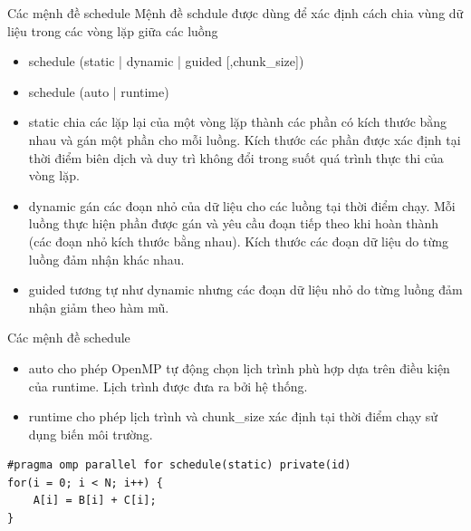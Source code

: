 \documentclass[10pt]{beamer}
\theoremstyle{remark}
\numberwithin{algocf}{section}
\numberwithin{equation}{section}
\numberwithin{dl}{section}
\numberwithin{figure}{section}
\begin{document}
\begin{frame}[fragile]{Các mệnh đề schedule}
    Mệnh đề schdule được dùng để xác định cách chia vùng dữ liệu trong các vòng lặp giữa các luồng
    \begin{itemize}
        \item schedule (static | dynamic | guided [,chunk\_size])
        \item schedule (auto | runtime)
    \end{itemize}
    \begin{itemize}
        \item static chia các lặp lại của một vòng lặp thành các phần có kích thước bằng nhau và gán một phần cho mỗi luồng.
        Kích thước các phần được xác định tại thời điểm biên dịch và duy trì không đổi trong suốt quá trình thực thi của vòng lặp.
        \item dynamic gán các đoạn nhỏ của dữ liệu cho các luồng tại thời điểm chạy.
        Mỗi luồng thực hiện phần được gán và yêu cầu đoạn tiếp theo khi hoàn thành (các đoạn nhỏ kích thước bằng nhau).
        Kích thước các đoạn dữ liệu do từng luồng đảm nhận khác nhau.
        \item guided tương tự như dynamic nhưng các đoạn dữ liệu nhỏ do từng luồng đảm nhận giảm theo hàm mũ.
    \end{itemize}
\end{frame}

\begin{frame}[fragile]{Các mệnh đề schedule}

    \begin{itemize}
        \item auto cho phép OpenMP tự động chọn lịch trình phù hợp dựa trên điều kiện của runtime.
        Lịch trình được đưa ra bởi hệ thống.
        \item runtime cho phép lịch trình và chunk\_size xác định tại thời điểm chạy sử dụng biến môi trường.
    \end{itemize}
    \begin{verbatim}
#pragma omp parallel for schedule(static) private(id)
for(i = 0; i < N; i++) {
    A[i] = B[i] + C[i];
}
    \end{verbatim}
\end{frame}
\end{document}
